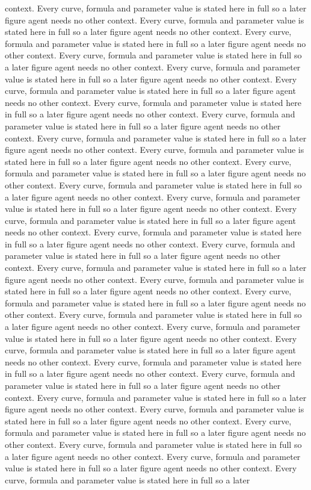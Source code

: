 \documentclass[11pt]{article}
\begin{document}
context. Every curve, formula and parameter value is stated here in full so a later figure agent needs no other context. Every curve, formula and parameter value is stated here in full so a later figure agent needs no other context. Every curve, formula and parameter value is stated here in full so a later figure agent needs no other context. Every curve, formula and parameter value is stated here in full so a later figure agent needs no other context. Every curve, formula and parameter value is stated here in full so a later figure agent needs no other context. Every curve, formula and parameter value is stated here in full so a later figure agent needs no other context. Every curve, formula and parameter value is stated here in full so a later figure agent needs no other context. Every curve, formula and parameter value is stated here in full so a later figure agent needs no other context. Every curve, formula and parameter value is stated here in full so a later figure agent needs no other context. Every curve, formula and parameter value is stated here in full so a later figure agent needs no other context. Every curve, formula and parameter value is stated here in full so a later figure agent needs no other context. Every curve, formula and parameter value is stated here in full so a later figure agent needs no other context. Every curve, formula and parameter value is stated here in full so a later figure agent needs no other context. Every curve, formula and parameter value is stated here in full so a later figure agent needs no other context. Every curve, formula and parameter value is stated here in full so a later figure agent needs no other context. Every curve, formula and parameter value is stated here in full so a later figure agent needs no other context. Every curve, formula and parameter value is stated here in full so a later figure agent needs no other context. Every curve, formula and parameter value is stated here in full so a later figure agent needs no other context. Every curve, formula and parameter value is stated here in full so a later figure agent needs no other context. Every curve, formula and parameter value is stated here in full so a later figure agent needs no other context. Every curve, formula and parameter value is stated here in full so a later figure agent needs no other context. Every curve, formula and parameter value is stated here in full so a later figure agent needs no other context. Every curve, formula and parameter value is stated here in full so a later figure agent needs no other context. Every curve, formula and parameter value is stated here in full so a later figure agent needs no other context. Every curve, formula and parameter value is stated here in full so a later figure agent needs no other context. Every curve, formula and parameter value is stated here in full so a later figure agent needs no other context. Every curve, formula and parameter value is stated here in full so a later figure agent needs no other context. Every curve, formula and parameter value is stated here in full so a later figure agent needs no other context. Every curve, formula and parameter value is stated here in full so a later figure agent needs no other context. Every curve, formula and parameter value is stated here in full so a later 
\end{document}
